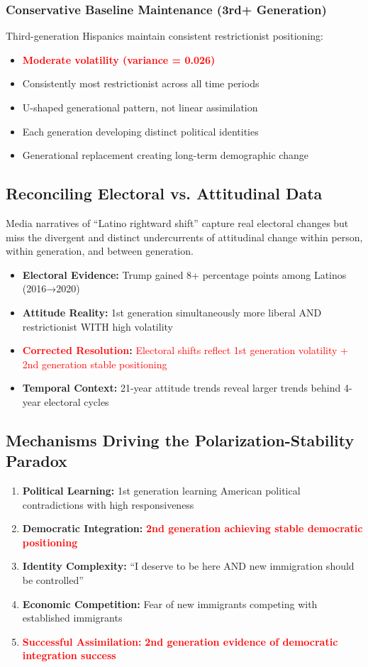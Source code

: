 \documentclass[11pt,letterpaper]{article}
\newcommand{\compactdesc}[2]{\item \textbf{#1:} #2}
\begin{document}
\subsubsection{Conservative Baseline Maintenance (3rd+ Generation)}
Third-generation Hispanics maintain consistent restrictionist positioning:
\begin{itemize}
    \item \textcolor{red}{\textbf{Moderate volatility (variance = 0.026)}}
    \item Consistently most restrictionist across all time periods
    \item U-shaped generational pattern, not linear assimilation
    \item Each generation developing distinct political identities
    \item Generational replacement creating long-term demographic change
\end{itemize}

\subsection{Reconciling Electoral vs. Attitudinal Data}

Media narratives of ``Latino rightward shift'' capture real electoral changes but miss the divergent and distinct undercurrents of attitudinal change within person, within generation, and between generation.

\begin{itemize}
    \compactdesc{Electoral Evidence}{Trump gained 8+ percentage points among Latinos (2016→2020)}
    \compactdesc{Attitude Reality}{1st generation simultaneously more liberal AND restrictionist WITH high volatility}
    \compactdesc{\textcolor{red}{Corrected Resolution}}{\textcolor{red}{Electoral shifts reflect 1st generation volatility + 2nd generation stable positioning}}
    \compactdesc{Temporal Context}{21-year attitude trends reveal larger trends behind 4-year electoral cycles}
\end{itemize}

\subsection{Mechanisms Driving the Polarization-Stability Paradox}

\begin{enumerate}
    \item \textbf{Political Learning:} 1st generation learning American political contradictions with high responsiveness
    \item \textbf{Democratic Integration:} \textcolor{red}{\textbf{2nd generation achieving stable democratic positioning}}
    \item \textbf{Identity Complexity:} ``I deserve to be here AND new immigration should be controlled''
    \item \textbf{Economic Competition:} Fear of new immigrants competing with established immigrants
    \item \textbf{\textcolor{red}{Successful Assimilation:}} \textcolor{red}{\textbf{2nd generation evidence of democratic integration success}}
\end{enumerate}
\end{document}
